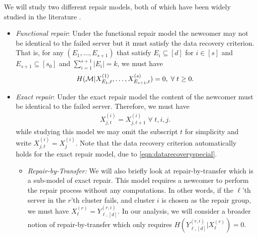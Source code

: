 \documentclass[journal,onecolumn,draftcls]{IEEEtran}
\begin{document}
We will study two different repair models, both of which have been widely studied in the literature \cite{dimakis2010network,ye2017explicit,rashmi2009explicit,rashmi2011optimal,shah2012interference,cadambe2013asymptotic,sasidharan2014improved,prakash2015storage,olmez2016fractional,dimakis2011survey,kamath2013explicit}. 
\begin{itemize}
\item {\it Functional repair}: Under the functional repair model the newcomer may not be identical to the failed server but it must satisfy the data recovery criterion. That is, for any $(E_1,\dots, E_{s+1})$ that satisfy $E_i\subseteq [d]$ for $i\in[s]$ and $E_{s+1}\subseteq[s_0]$ and $\sum_{i=1}^{s+1} |E_i| = k$, we must have
\begin{eqnarray}
H({\cal M}|X^{(1)}_{E_1,t},\dots, X^{(s)}_{E_{s+1},t}) = 0,  \; \forall  \; t\ge 0 .
\label{eqn:datarecoverygeneral}
\end{eqnarray}
\item {\it Exact repair}: Under the exact repair model the content of the newcomer must be identical to the failed server. Therefore, we must have
\begin{eqnarray*}
X^{(i)}_{j,t} = X^{(i)}_{j,t+1} \; \forall \;t,i,j.
\end{eqnarray*}
while studying this model we may omit the subscript $t$ for simplicity and write $X^{(i)}_{j,t}  = X^{(i)}_{j} $. Note that the data recovery criterion automatically holds for the exact repair model, due to \eqref{eqn:datarecoveryspecial}.
\begin{itemize}
\item {\it Repair-by-Transfer:} We will also briefly look at repair-by-transfer \cite{shah2012distributed} which is a sub-model of exact repair. This model requires a newcomer to perform the repair process without any computations. In other words, if the $\ell$'th server in the $r$'th cluster fails, and cluster $i$ is chosen as the repair group, we must have $X^{(r)}_\ell = Y^{(r,i)}_{\ell,[d]}$. In our analysis, we will consider a broader notion of repair-by-transfer which only requires $H( Y^{(r,i)}_{\ell,[d]} |X^{(r)}_\ell) = 0$. 
\end{itemize}



\end{itemize}
\end{document}

